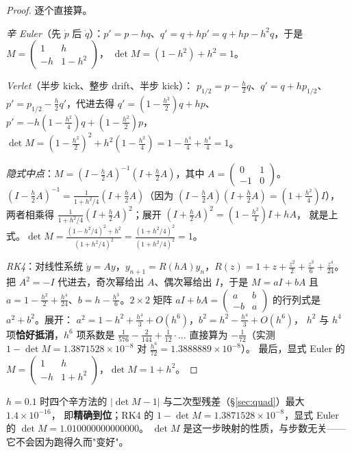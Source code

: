 \begin{proof}
逐个直接算。

\emph{辛 Euler}（先 $\dot p$ 后 $\dot q$）：$p'=p-hq$、$q'=q+hp'=q+hp-h^2q$，于是
$M=\begin{pmatrix}1&h\\-h&1-h^2\end{pmatrix}$，
$\det M=(1-h^2)+h^2=1$。

\emph{Verlet}（半步 kick、整步 drift、半步 kick）：
$p_{1/2}=p-\tfrac h2q$、$q'=q+hp_{1/2}$、$p'=p_{1/2}-\tfrac h2q'$，代进去得
$q'=(1-\tfrac{h^2}{2})q+hp$、$p'=-h(1-\tfrac{h^2}{4})q+(1-\tfrac{h^2}{2})p$，
$\det M=(1-\tfrac{h^2}{2})^2+h^2(1-\tfrac{h^2}{4})=1-\tfrac{h^4}{4}+\tfrac{h^4}{4}=1$。

\emph{隐式中点}：$M=(I-\tfrac h2A)^{-1}(I+\tfrac h2A)$，其中 $A=\begin{pmatrix}0&1\\-1&0\end{pmatrix}$。
$(I-\tfrac h2A)^{-1}=\frac{1}{1+h^2/4}(I+\tfrac h2A)$（因为 $(I-\tfrac h2A)(I+\tfrac h2A)=(1+\tfrac{h^2}{4})I$），
两者相乘得 $\frac{1}{1+h^2/4}(I+\tfrac h2A)^2$；展开 $(I+\tfrac h2A)^2=(1-\tfrac{h^2}{4})I+hA$，
就是上式。$\det M=\frac{(1-h^2/4)^2+h^2}{(1+h^2/4)^2}=\frac{(1+h^2/4)^2}{(1+h^2/4)^2}=1$。

\emph{RK4}：对线性系统 $\dot y=Ay$，$y_{n+1}=R(hA)y_n$，$R(z)=1+z+\tfrac{z^2}{2}+\tfrac{z^3}{6}+\tfrac{z^4}{24}$。
把 $A^2=-I$ 代进去，奇次幂给出 $A$、偶次幂给出 $I$，于是 $M=aI+bA$ 且
$a=1-\tfrac{h^2}{2}+\tfrac{h^4}{24}$、$b=h-\tfrac{h^3}{6}$。$2\times2$ 矩阵 $aI+bA=\begin{pmatrix}a&b\\-b&a\end{pmatrix}$
的行列式是 $a^2+b^2$。展开：
$a^2=1-h^2+\tfrac{h^4}{3}+O(h^6)$，$b^2=h^2-\tfrac{h^4}{3}+O(h^6)$，
$h^2$ 与 $h^4$ 项\textbf{恰好抵消}，$h^6$ 项系数是
$\tfrac{1}{576}-\tfrac{2}{144}+\tfrac{1}{12}\cdot\ldots$ 直接算为 $-\tfrac1{72}$（实测 $1-\det M=1.3871528\times10^{-8}$ 对 $\tfrac{h^6}{72}=1.3888889\times10^{-8}$）。
最后，显式 Euler 的 $M=\begin{pmatrix}1&h\\-h&1+h^2\end{pmatrix}$，$\det M=1+h^2$。
\end{proof}

\begin{remark}[实测]
$h=0.1$ 时四个辛方法的 $|\det M-1|$ 与二次型残差（\S\ref{sec:quad}）最大 $1.4\times10^{-16}$，
即\textbf{精确到位}；RK4 的 $1-\det M=1.3871528\times10^{-8}$，显式 Euler 的 $\det M=1.010000000000000$。
$\det M$ 是这一步映射的性质，与步数无关——它不会因为跑得久而"变好"。
\end{remark}

